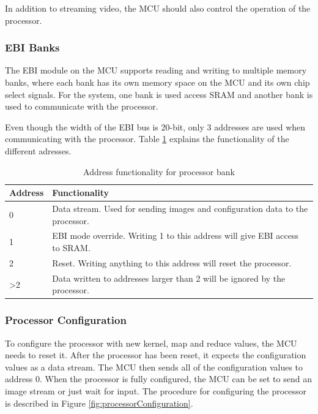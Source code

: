 In addition to streaming video, the MCU should also control the operation of the processor.

\subsubsection{EBI Banks}
The EBI module on the MCU supports reading and writing to multiple memory banks, where each bank has its own memory space on the MCU and its own chip select signals. For the system, one bank is used access SRAM and another bank is used to communicate with the processor.

Even though the width of the EBI bus is 20-bit, only 3 addresses are used when communicating with the processor. Table \ref{ebi_processor_addresses} explains the functionality of the different adresses.

\begin{table}[h!]
\centering
	\begin{tabular}{ | l | p{10cm} |}
		\hline
		Address & Functionality \\ \hline
		0 & Data stream. Used for sending images and configuration data to the processor. \\ \hline
		1 & EBI mode override. Writing 1 to this address will give EBI access to SRAM. \\ \hline
		2 & Reset. Writing anything to this address will reset the processor. \\ \hline
		>2 & Data written to addresses larger than 2 will be ignored by the processor. \\ \hline
	\end{tabular}
	\caption{Address functionality for processor bank}
	\label{ebi_processor_addresses}
\end{table}


\subsubsection{Processor Configuration}
To configure the processor with new kernel, map and reduce values, the MCU needs to reset it. After the processor has been reset, it expects the configuration values as a data stream. The MCU then sends all of the configuration values to address 0. When the processor is fully configured, the MCU can be set to send an image stream or just wait for input. The procedure for configuring the processor is described in Figure \ref{fig:processorConfiguration}.


